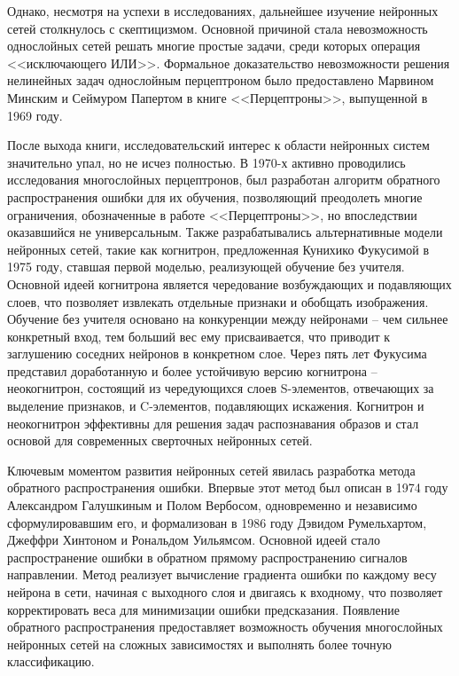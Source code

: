 Однако, несмотря на успехи в исследованиях, дальнейшее изучение нейронных сетей столкнулось с скептицизмом. Основной причиной стала невозможность однослойных сетей решать многие простые задачи, среди которых операция <<исключающего ИЛИ>>. Формальное доказательство невозможности решения нелинейных задач однослойным перцептроном было предоставлено Марвином Минским и Сеймуром Папертом в книге <<Перцептроны>>, выпущенной в 1969 году. 
 
 После выхода книги, исследовательский интерес к области нейронных систем значительно упал, но не исчез полностью. В 1970-х активно проводились исследования многослойных перцептронов, был разработан алгоритм обратного распространения ошибки для их обучения, позволяющий преодолеть многие ограничения, обозначенные в работе <<Перцептроны>>, но впоследствии оказавшийся не универсальным. Также разрабатывались альтернативные модели нейронных сетей, такие как когнитрон, предложенная Кунихико Фукусимой в 1975 году, ставшая первой моделью, реализующей обучение без учителя. Основной идеей когнитрона является чередование возбуждающих и подавляющих слоев, что позволяет извлекать отдельные признаки и обобщать изображения. Обучение без учителя основано на конкуренции между нейронами -- чем сильнее конкретный вход, тем больший вес ему присваивается, что приводит к заглушению соседних нейронов в конкретном слое. Через пять лет Фукусима представил доработанную и более устойчивую версию когнитрона -- неокогнитрон, состоящий из чередующихся слоев S-элементов, отвечающих за выделение признаков, и C-элементов, подавляющих искажения. Когнитрон и неокогнитрон эффективны для решения задач распознавания образов и стал основой для современных сверточных нейронных сетей. 
 
 Ключевым моментом развития нейронных сетей явилась разработка метода обратного распространения ошибки. Впервые этот метод был описан в 1974 году Александром Галушкиным и Полом Вербосом, одновременно и независимо сформулировавшим его, и формализован в 1986 году Дэвидом Румельхартом, Джеффри Хинтоном и Рональдом Уильямсом. Основной идеей стало распространение ошибки в обратном прямому распространению сигналов направлении. Метод реализует вычисление градиента ошибки по каждому весу нейрона в сети, начиная с выходного слоя и двигаясь к входному, что позволяет корректировать веса для минимизации ошибки предсказания. Появление обратного распространения предоставляет возможность обучения многослойных нейронных сетей на сложных зависимостях и выполнять более точную классификацию.
 
